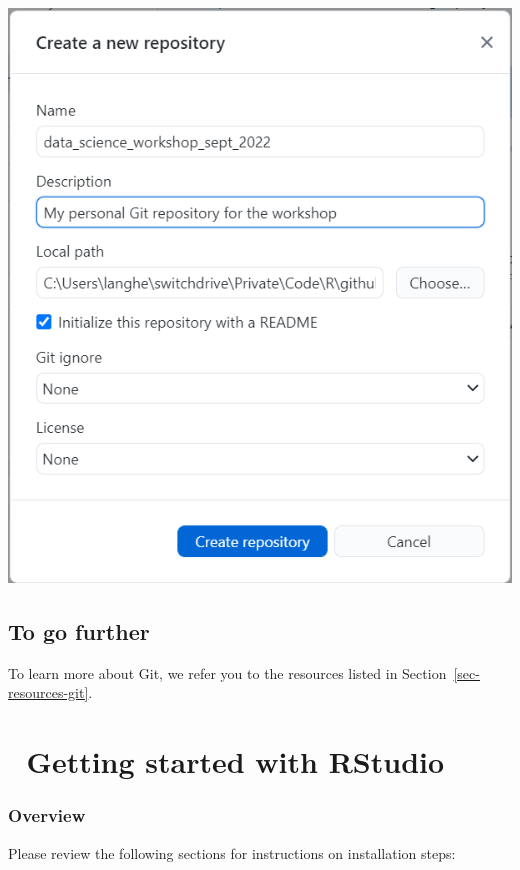 \documentclass[
  letterpaper,
  DIV=11,
  numbers=noendperiod,
  oneside]{scrreprt}
\begin{document}
\includegraphics{./images/paste-D831B36F.png}

\hypertarget{to-go-further}{%
\section{To go further}\label{to-go-further}}

To learn more about Git, we refer you to the resources listed in
Section~\ref{sec-resources-git}.

\hypertarget{getting-started-with-rstudio}{%
\chapter{\texorpdfstring{{📘} Getting started with
RStudio}{📘 Getting started with RStudio}}\label{getting-started-with-rstudio}}

\hypertarget{overview-2}{%
\subsection{Overview}\label{overview-2}}

Please review the following sections for instructions on installation
steps:
\end{document}
